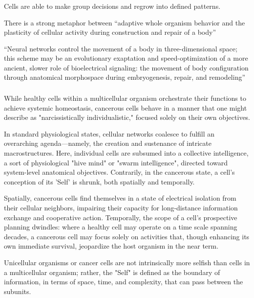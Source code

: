\subsubsection{}

Cells are able to make group decisions and regrow into defined patterns.

There is a strong metaphor between “adaptive whole organism behavior and the plasticity of cellular activity during construction and repair of a body”

“Neural networks control the movement of a body in three-dimensional space; this scheme may be an evolutionary exaptation and speed-optimization of a more ancient, slower role of bioelectrical signaling: the movement of body configuration through anatomical morphospace during embryogenesis, repair, and remodeling”

\subsubsection{}

While healthy cells within a multicellular organism orchestrate their functions to achieve systemic homeostasis, cancerous cells behave in a manner that one might describe as "narcissistically individualistic," focused solely on their own objectives.

In standard physiological states, cellular networks coalesce to fulfill an overarching agenda—namely, the creation and sustenance of intricate macrostructures. Here, individual cells are subsumed into a collective intelligence, a sort of physiological "hive mind" or "swarm intelligence", directed toward system-level anatomical objectives. Contrarily, in the cancerous state, a cell's conception of its 'Self' is shrunk, both spatially and temporally.

Spatially, cancerous cells find themselves in a state of electrical isolation from their cellular neighbors, impairing their capacity for long-distance information exchange and cooperative action. Temporally, the scope of a cell's prospective planning dwindles: where a healthy cell may operate on a time scale spanning decades, a cancerous cell may focus solely on activities that, though enhancing its own immediate survival, jeopardize the host organism in the near term.

Unicellular organisms or cancer cells are not intrinsically more selfish than cells in a multicellular organism; rather, the "Self" is defined as the boundary of information, in terms of space, time, and complexity, that can pass between the subunits. 


